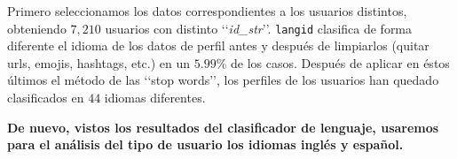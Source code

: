 Primero seleccionamos los datos correspondientes a los usuarios distintos, obteniendo
$7,210$ usuarios con distinto \lq\lq{\em id\_str}\rq\rq. {\tt langid} clasifica de 
forma diferente el idioma de los datos de perfil antes y después de 
limpiarlos (quitar urls, emojis, hashtags, etc.) en un $5.99$\%
de los casos. Después de aplicar en éstos últimos el método de las \lq\lq stop words\rq\rq, 
los perfiles de los usuarios han quedado clasificados en $44$ idiomas diferentes.


{\bf De nuevo, vistos los resultados del clasificador de lenguaje, usaremos para el análisis del tipo 
de usuario los idiomas inglés y español.}


